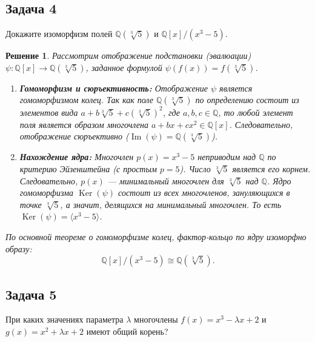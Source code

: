 \documentclass[14pt]{article}
\newtheorem*{solution}{Решение}
\begin{document}
	\subsection*{Задача 4}
	Докажите изоморфизм полей $\mathbb{Q}(\sqrt[3]{5})$ и $\mathbb{Q}[x]/(x^3 - 5)$.
	
	\begin{solution}
		Рассмотрим отображение подстановки (эвалюации) $\psi: \mathbb{Q}[x] \to \mathbb{Q}(\sqrt[3]{5})$, заданное формулой $\psi(f(x)) = f(\sqrt[3]{5})$.
		
		\begin{enumerate}
			\item \textbf{Гомоморфизм и сюръективность:} Отображение $\psi$ является гомоморфизмом колец. Так как поле $\mathbb{Q}(\sqrt[3]{5})$ по определению состоит из элементов вида $a + b\sqrt[3]{5} + c(\sqrt[3]{5})^2$, где $a,b,c \in \mathbb{Q}$, то любой элемент поля является образом многочлена $a + bx + cx^2 \in \mathbb{Q}[x]$. Следовательно, отображение сюръективно ($\operatorname{Im}(\psi) = \mathbb{Q}(\sqrt[3]{5})$).
			
			\item \textbf{Нахождение ядра:} Многочлен $p(x) = x^3 - 5$ неприводим над $\mathbb{Q}$ по критерию Эйзенштейна (с простым $p=5$). Число $\sqrt[3]{5}$ является его корнем. Следовательно, $p(x)$ — минимальный многочлен для $\sqrt[3]{5}$ над $\mathbb{Q}$. Ядро гомоморфизма $\operatorname{Ker}(\psi)$ состоит из всех многочленов, зануляющихся в точке $\sqrt[3]{5}$, а значит, делящихся на минимальный многочлен. То есть $\operatorname{Ker}(\psi) = \langle x^3 - 5 \rangle$.
		\end{enumerate}
		По основной теореме о гомоморфизме колец, фактор-кольцо по ядру изоморфно образу:
		\[
		\mathbb{Q}[x]/(x^3 - 5) \cong \mathbb{Q}(\sqrt[3]{5}).
		\]
	\end{solution}
	
	\subsection*{Задача 5}
	При каких значениях параметра $\lambda$ многочлены $f(x) = x^3 - \lambda x + 2$ и $g(x) = x^2 + \lambda x + 2$ имеют общий корень?
	
\end{document}
